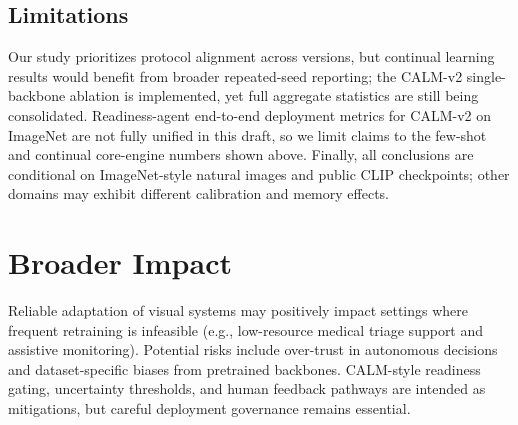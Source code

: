 \documentclass{article}
\begin{document}
\begin{center}
\end{center}
\label{fig:tradeoff}

\subsection{Limitations}\label{sec:limitations}
Our study prioritizes protocol alignment across versions, but continual learning results would benefit from broader repeated-seed reporting; the CALM-v2 single-backbone ablation is implemented, yet full aggregate statistics are still being consolidated. Readiness-agent end-to-end deployment metrics for CALM-v2 on ImageNet are not fully unified in this draft, so we limit claims to the few-shot and continual core-engine numbers shown above. Finally, all conclusions are conditional on ImageNet-style natural images and public CLIP checkpoints; other domains may exhibit different calibration and memory effects.

\section{Broader Impact}
Reliable adaptation of visual systems may positively impact settings where frequent retraining is infeasible (e.g., low-resource medical triage support and assistive monitoring). Potential risks include over-trust in autonomous decisions and dataset-specific biases from pretrained backbones. CALM-style readiness gating, uncertainty thresholds, and human feedback pathways are intended as mitigations, but careful deployment governance remains essential.
\end{document}
